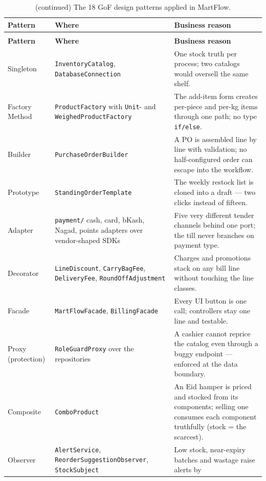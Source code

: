 \documentclass[12pt,a4paper]{report}
\begin{document}
\begin{longtable}{p{2.9cm}p{4.3cm}p{7.2cm}}
\caption{The 18 GoF design patterns applied in MartFlow.}
\label{tab:patterns}\\
\toprule
\textbf{Pattern} & \textbf{Where} & \textbf{Business reason} \\
\midrule
\endfirsthead
\caption[]{(continued) The 18 GoF design patterns applied in MartFlow.}\\
\toprule
\textbf{Pattern} & \textbf{Where} & \textbf{Business reason} \\
\midrule
\endhead
\bottomrule
\endfoot
\bottomrule
\endlastfoot
Singleton & \texttt{InventoryCatalog}, \texttt{DatabaseConnection} & One stock truth
per process; two catalogs would oversell the same shelf. \\
Factory Method & \texttt{ProductFactory} with \texttt{Unit}- and
\texttt{WeighedProductFactory} & The add-item form creates per-piece and per-kg items
through one path; no type \texttt{if/else}. \\
Builder & \texttt{PurchaseOrderBuilder} & A PO is assembled line by line with
validation; no half-configured order can escape into the workflow. \\
Prototype & \texttt{StandingOrderTemplate} & The weekly restock list is cloned into a
draft --- two clicks instead of fifteen. \\
Adapter & \texttt{payment/} cash, card, bKash, Nagad, points adapters over vendor-shaped
SDKs & Five very different tender channels behind one port; the till never branches on
payment type. \\
Decorator & \texttt{LineDiscount}, \texttt{CarryBagFee}, \texttt{DeliveryFee},
\texttt{RoundOffAdjustment} & Charges and promotions stack on any bill line without
touching the line classes. \\
Facade & \texttt{MartFlowFacade}, \texttt{BillingFacade} & Every UI button is one call;
controllers stay one line and testable. \\
Proxy (protection) & \texttt{RoleGuardProxy} over the repositories & A cashier cannot
reprice the catalog even through a buggy endpoint --- enforced at the data boundary. \\
Composite & \texttt{ComboProduct} & An Eid hamper is priced and stocked from its
components; selling one consumes each component truthfully (stock = the scarcest). \\
Observer & \texttt{AlertService}, \texttt{ReorderSuggestionObserver},
\texttt{StockSubject} & Low stock, near-expiry batches and wastage raise alerts by

\end{longtable}
\end{document}
